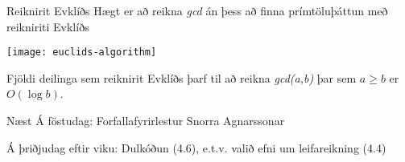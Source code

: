 \documentclass[handout]{beamer}
\begin{document}
\begin{frame}{Reiknirit Evklíðs}
    Hægt er að reikna \emph{gcd} án þess að finna prímtöluþáttun með reikniriti Evklíðs

    \begin{center}
        \texttt{[image: euclids-algorithm]}
    \end{center}

    Fjöldi deilinga sem reiknirit Evklíðs þarf til að reikna \emph{gcd(a,b)} þar sem $a \geq b$ er $O(\log b)$.
\end{frame}

\begin{frame}{Næst}
    Á föstudag: Forfallafyrirlestur Snorra Agnarssonar

    Á þriðjudag eftir viku: Dulkóðun (4.6), e.t.v. valið efni um leifareikning (4.4)
\end{frame}
\end{document}
